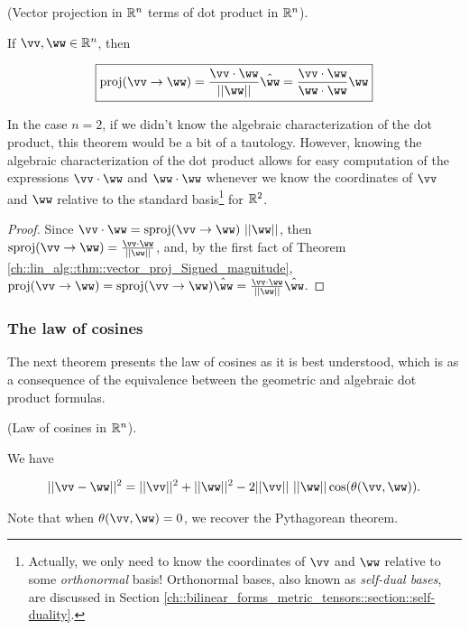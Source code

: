 \begin{theorem}
\label{ch::lin_alg::thm::vector_proj_dot_product}
    (Vector projection in $\mathbb{R}^n$ terms of dot product in $\mathbb{R}^n$).
    
    If $\vv, \ww \in \R^n$, then
    
    \begin{align*}
        \boxed
        {
            \proj(\vv \rightarrow \ww) = \frac{\vv \cdot \ww}{||\ww||} \hww = \frac{\vv \cdot \ww}{\ww \cdot \ww} \ww
        }
    \end{align*}
    
    In the case $n = 2$, if we didn't know the algebraic characterization of the dot product, this theorem would be a bit of a tautology. However, knowing the algebraic characterization of the dot product allows for easy computation of the expressions $\vv \cdot \ww$ and $\ww \cdot \ww$ whenever we know the coordinates of $\vv$ and $\ww$ relative to the standard basis\footnote{Actually, we only need to know the coordinates of $\vv$ and $\ww$ relative to some \textit{orthonormal} basis! Orthonormal bases, also known as \textit{self-dual bases}, are discussed in Section \ref{ch::bilinear_forms_metric_tensors::section::self-duality}.} for $\mathbb{R}^2$.
\end{theorem}

\begin{proof}
   Since $\vv \cdot \ww = \sproj(\vv \rightarrow \ww) \spc ||\ww||$, then $\sproj(\vv \rightarrow \ww) = \frac{\vv \cdot \ww}{||\ww||}$, and, by the first fact of Theorem \ref{ch::lin_alg::thm::vector_proj_Signed_magnitude}, $\proj(\vv \rightarrow \ww) = \sproj(\vv \rightarrow \ww) \hww = \frac{\vv \cdot \ww}{||\ww||} \hww$.
\end{proof}

\subsubsection*{The law of cosines}

The next theorem presents the law of cosines as it is best understood, which is as a consequence of the equivalence between the geometric and algebraic dot product formulas.

\begin{theorem}
\label{ch::lin_alg::thm::law_of_cosines}
    (Law of cosines in $\mathbb{R}^n$). 
    
    We have

    \begin{align*}
        ||\vv - \ww||^2 = ||\vv||^2 + ||\ww||^2 - 2 ||\vv|| \spc ||\ww|| \cos(\theta(\vv, \ww)).
    \end{align*}
    
    Note that when $\theta(\vv, \ww) = 0$, we recover the Pythagorean theorem.
\end{theorem}

